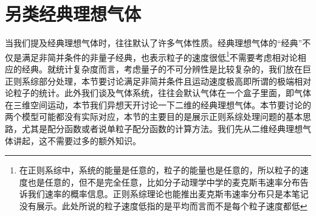 \documentclass[../../main.tex]{subfiles}
\begin{document}
\section{另类经典理想气体}

当我们提及经典理想气体时，往往默认了许多气体性质。经典理想气体的“经典”不仅是满足非简并条件的非量子经典，也表示粒子的速度很低\footnote{在正则系综中，系统的能量是任意的，粒子的能量也是任意的，所以粒子的速度也是任意的，但不是完全任意，比如分子动理学中学的麦克斯韦速率分布告诉我们速率的概率信息。正则系综理论也能推出麦克斯韦速率分布只是本笔记没有展示。此处所说的粒子速度低指的是平均而言而不是每个粒子速度都低}不需要考虑相对论相应的经典。就统计复杂度而言，考虑量子的不可分辨性是比较复杂的，我们放在巨正则系综部分处理，本节要讨论满足非简并条件且运动速度极高即所谓的极端相对论粒子的统计。此外我们谈及气体系统，往往会默认气体在一个盒子里面，即气体在三维空间运动，本节我们异想天开讨论一下二维的经典理想气体。本节要讨论的两个模型可能都没有实际对应，本节的主要目的是展示正则系综处理问题的基本思路，尤其是配分函数或者说单粒子配分函数的计算方法。我们先从二维经典理想气体讲起，这不需要过多的额外知识。
\end{document}
